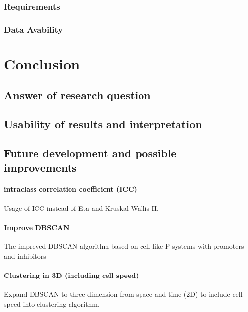 \documentclass[a4paper,headsepline,footsepline,fontsize=11pt,BCOR=12mm,DIV=12]{report}
\begin{document}
\subsection{Requirements}



\subsection{Data Avability}




\chapter{Conclusion}



\section{Answer of research question}



\section{Usability of results and interpretation}



\section{Future development and possible improvements} 



\subsubsection{intraclass correlation coefficient (ICC)}
Usage of ICC instead of Eta and Kruskal-Wallis H.

\subsubsection{Improve DBSCAN}
The improved DBSCAN algorithm based on cell-like P systems with promoters and inhibitors

\subsubsection{Clustering in 3D (including cell speed)}
Expand DBSCAN to three dimension from space and time (2D) to include cell speed into clustering algorithm.
\end{document}
